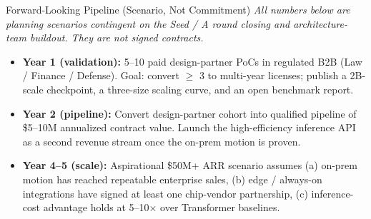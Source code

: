 ﻿\documentclass[aspectratio=169, 10pt]{beamer}
\begin{document}
\begin{frame}{Forward-Looking Pipeline (Scenario, Not Commitment)}
\footnotesize
\textit{All numbers below are planning scenarios contingent on the Seed / A round closing and architecture-team buildout. They are not signed contracts.}
\begin{itemize}\itemsep=0.3em
    \item \textbf{Year 1 (validation):} 5--10 paid design-partner PoCs in regulated B2B (Law / Finance / Defense). Goal: convert $\geq$ 3 to multi-year licenses; publish a 2B-scale checkpoint, a three-size scaling curve, and an open benchmark report.
    \item \textbf{Year 2 (pipeline):} Convert design-partner cohort into qualified pipeline of \$5--10M annualized contract value. Launch the high-efficiency inference API as a second revenue stream once the on-prem motion is proven.
    \item \textbf{Year 4--5 (scale):} Aspirational \$50M+ ARR scenario assumes (a) on-prem motion has reached repeatable enterprise sales, (b) edge / always-on integrations have signed at least one chip-vendor partnership, (c) inference-cost advantage holds at 5--10$\times$ over Transformer baselines.
\end{itemize}
\end{frame}
\end{document}
